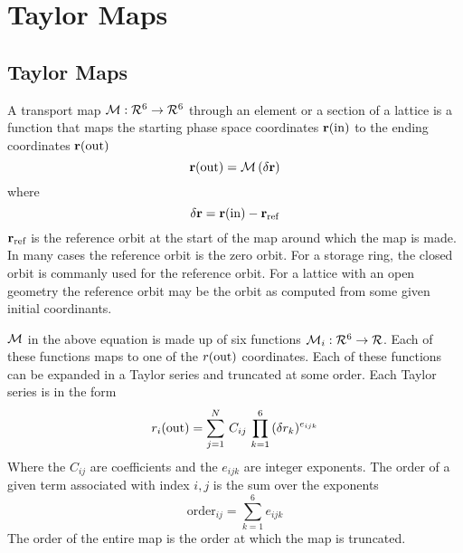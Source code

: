 \chapter{Taylor Maps}

\section{Taylor Maps}
\label{s:taylor.phys}

A transport map ${\cal M}: {\cal R}^6 \rightarrow {\cal R}^6$ through
an element or a section of a lattice is a function that maps the
starting phase space coordinates ${\bf r}({\text{in}})$ to the ending
coordinates ${\bf r}({\text{out}})$
\begin{equation}
  {\bf r}({\text{out}}) = {\cal M} \, (\delta {\bf r})
\end{equation}
where
\begin{equation}
  \delta {\bf r} = {\bf r}({\text{in}}) - {\bf r}_{\text{ref}}
\end{equation}
${\bf r}_{\text{ref}}$ is the reference orbit at the start of the map around which the map is
made. In many cases the reference orbit is the zero orbit. For a storage ring, the closed
orbit is commanly used for the reference orbit. For a lattice with an open geometry the
reference orbit may be the orbit as computed from some given initial coordinants.

${\cal M}$ in the above equation is made up of six functions ${\cal M}_i: {\cal R}^6
\rightarrow {\cal R}$. Each of these functions maps to one of the $r({\text{out}})$
coordinates. Each of these functions can be expanded in a Taylor series and truncated at
some order. Each Taylor series is in the form
\begin{equation}
  r_i({\text{out}}) = \sum_{j = 1}^N \, C_{ij} \, \prod_{k = 1}^6 \, (\delta r_k)^{e_{ijk}}
  \label{rcr}
\end{equation}
Where the $C_{ij}$ are coefficients and the $e_{ijk}$ are integer exponents.
The order of a given term associated with index $i,j$ is the sum over the exponents
\begin{equation}
  \text{order}_{ij} = \sum_{k = 1}^6 e_{ijk} 
\end{equation}
The order of the entire map is the order at which the map is truncated.

